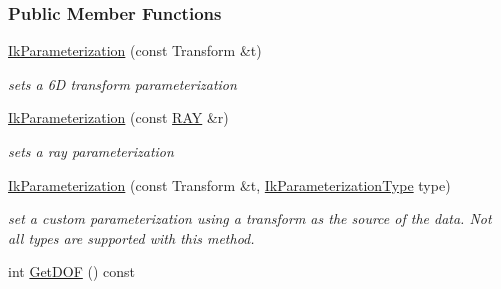 \subsubsection*{Public Member Functions}
\begin{DoxyCompactItemize}
\item 
\hypertarget{classOpenRAVE_1_1IkParameterization_ab994a253edd28a41888587bd321cbc57}{
\hyperlink{classOpenRAVE_1_1IkParameterization_ab994a253edd28a41888587bd321cbc57}{IkParameterization} (const Transform \&t)}
\label{classOpenRAVE_1_1IkParameterization_ab994a253edd28a41888587bd321cbc57}

\begin{DoxyCompactList}\small\item\em sets a 6D transform parameterization \item\end{DoxyCompactList}\item 
\hypertarget{classOpenRAVE_1_1IkParameterization_a64665dcd48df2d9d27a121e9f850afa9}{
\hyperlink{classOpenRAVE_1_1IkParameterization_a64665dcd48df2d9d27a121e9f850afa9}{IkParameterization} (const \hyperlink{classOpenRAVE_1_1geometry_1_1ray}{RAY} \&r)}
\label{classOpenRAVE_1_1IkParameterization_a64665dcd48df2d9d27a121e9f850afa9}

\begin{DoxyCompactList}\small\item\em sets a ray parameterization \item\end{DoxyCompactList}\item 
\hypertarget{classOpenRAVE_1_1IkParameterization_a94da438fe0e35f8c244d753cc815594c}{
\hyperlink{classOpenRAVE_1_1IkParameterization_a94da438fe0e35f8c244d753cc815594c}{IkParameterization} (const Transform \&t, \hyperlink{namespaceOpenRAVE_a16f7833e516a35d385ac594a44e44a2e}{IkParameterizationType} type)}
\label{classOpenRAVE_1_1IkParameterization_a94da438fe0e35f8c244d753cc815594c}

\begin{DoxyCompactList}\small\item\em set a custom parameterization using a transform as the source of the data. Not all types are supported with this method. \item\end{DoxyCompactList}\item 
\hypertarget{classOpenRAVE_1_1IkParameterization_ac938a6c271285a5468b805a3243e20e6}{
int \hyperlink{classOpenRAVE_1_1IkParameterization_ac938a6c271285a5468b805a3243e20e6}{GetDOF} () const }
\label{classOpenRAVE_1_1IkParameterization_ac938a6c271285a5468b805a3243e20e6}


\end{DoxyCompactItemize}
